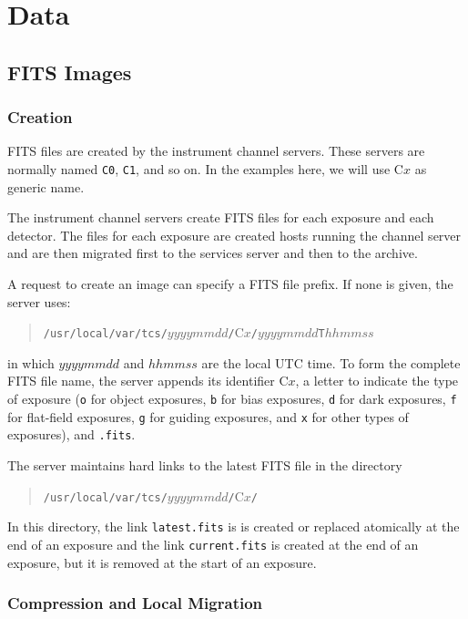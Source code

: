 \chapter{Data}
\label{chapter:data}

\newcommand{\Cx}{\mbox{\ttfamily C$x$}}

\section{FITS Images}

\subsection{Creation}

FITS files are created by the instrument channel servers. These servers are normally named \verb|C0|, \verb|C1|, and so on. In the examples here, we will use {\Cx} as generic name.

The instrument channel servers create FITS files for each exposure and each detector. The files for each exposure are created hosts running the channel server and are then migrated first to the services server and then to the archive.

A request to create an image can specify a FITS file prefix. If none is given, the server uses:
\begin{quote}
\verb|/usr/local/var/tcs/|$yyyymmdd$\verb|/|{\Cx}\verb|/|$yyyymmdd$\verb|T|$hhmmss$
\end{quote}
in which $yyyymmdd$ and $hhmmss$ are the local UTC time. To form the complete FITS file name, the server appends its identifier {\Cx}, a letter to indicate the type of exposure (\verb|o| for object exposures, \verb|b| for bias exposures, \verb|d| for dark exposures, \verb|f| for flat-field exposures, \verb|g| for guiding exposures, and \verb|x| for other types of exposures), and \verb|.fits|.

The server maintains hard links to the latest FITS file in the directory
\begin{quote}
\verb|/usr/local/var/tcs/|$yyyymmdd$\verb|/|{\Cx}\verb|/|
\end{quote}
In this directory, the link \verb|latest.fits| is is created or replaced atomically at the end of an exposure and the link \verb|current.fits| is created at the end of an exposure, but it is removed at the start of an exposure.

\subsection{Compression and Local Migration}

